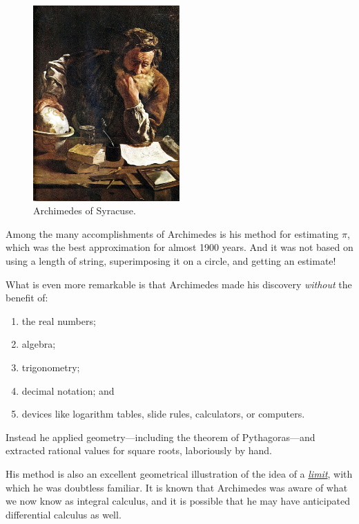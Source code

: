 \documentclass[
  a4paper,
]{article}
\begin{document}
\begin{figure}
\centering
\includegraphics[width=0.5\textwidth,height=\textheight]{images/Domenico-Fetti_Archimedes_1620.jpg}
\caption[Archimedes of Syracuse.]{Archimedes of
Syracuse.\footnotemark{}}\label{fig:archimedes}
\end{figure}

Among the many accomplishments of Archimedes is his method for
estimating \(\pi\), which was the best approximation for almost 1900
years. And it was not based on using a length of string, superimposing
it on a circle, and getting an estimate! \normalfont

What is even more remarkable is that Archimedes made his discovery
\emph{without} the benefit of:

\begin{enumerate}
\def\labelenumi{(\alph{enumi})}
\item
  the real numbers;
\item
  algebra;
\item
  trigonometry;
\item
  decimal notation; and
\item
  devices like logarithm tables, slide rules, calculators, or computers.
\end{enumerate}

Instead he applied geometry---including the theorem of Pythagoras---and
extracted rational values for square roots, laboriously by hand.

His method is also an excellent geometrical illustration of the idea of
a
\href{https://www.britannica.com/science/limit-mathematics}{\emph{limit}},
with which he was doubtless familiar. It is known that Archimedes was
aware of what we now know as integral calculus, and it is possible that
he may have anticipated differential calculus as well.
\end{document}
